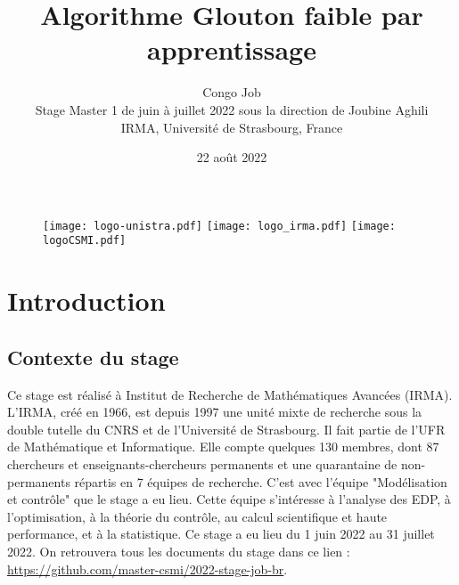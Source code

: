 \documentclass[12pt]{article}
\begin{document}
\begin{titlepage}
\title{Algorithme Glouton faible par apprentissage}
\author{Congo Job
\\ Stage Master 1 de juin à juillet 2022 sous la direction de Joubine Aghili \\
 IRMA, Université de Strasbourg, France}
\date{ 22 août 2022}

\begin{figure}[b!]
\centering
\vfill
\texttt{[image: logo-unistra.pdf]}
\hspace{0.5 cm}
\texttt{[image: logo\_irma.pdf]}
\hspace{0.5 cm}
\texttt{[image: logoCSMI.pdf]}
\end{figure}
\end{titlepage}


\maketitle
\thispagestyle{empty}


\newpage

\tableofcontents

\newpage

\section{Introduction}

\subsection{Contexte du stage}

Ce stage est réalisé à Institut de Recherche de Mathématiques Avancées (IRMA). L’IRMA, créé en 1966, est depuis 1997 une unité mixte de recherche
sous la double tutelle du CNRS et de l’Université de Strasbourg. Il fait partie de l’UFR de Mathématique et Informatique.
Elle compte quelques 130 membres, dont 87 chercheurs et enseignants-chercheurs permanents et une quarantaine de non-permanents répartis en 7 équipes de recherche. 
C'est avec l'équipe "Modélisation et contrôle" que le stage a eu lieu. 
Cette équipe s'intéresse à l’analyse des EDP, à l'optimisation, à la théorie du 
contrôle, au calcul scientifique et haute performance, et à la statistique. Ce stage a eu lieu du 1 juin 2022 au 31 juillet 2022. On retrouvera tous les documents du stage dans ce lien : \url{https://github.com/master-csmi/2022-stage-job-br}.
\end{document}
